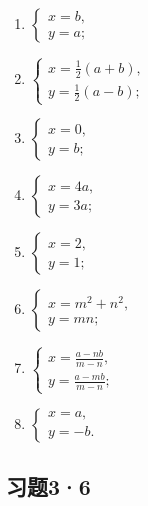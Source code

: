 \begin{enumerate}[start=1]
\item
  \(\left\{ \begin{array}{l} x = b, \\ y = a; \end{array} \right.\)
\item
  \(\left\{ \begin{array}{l} x = \frac{1}{2} (a + b), \\ y = \frac{1}{2} (a - b); \end{array} \right.\)
\item
  \(\left\{ \begin{array}{l} x = 0, \\ y = b; \end{array} \right.\)
\item
  \(\left\{ \begin{array}{l} x = 4a, \\ y = 3a; \end{array} \right.\)
\item
  \(\left\{ \begin{array}{l} x = 2, \\ y = 1; \end{array} \right.\)
\item
  \(\left\{ \begin{array}{l} x = m^2 + n^2, \\ y = mn; \end{array} \right.\)
\item
  \(\left\{ \begin{array}{l} x = \frac{a - nb}{m - n}, \\ y = \frac{a - mb}{m - n}; \end{array} \right.\)
\item
  \(\left\{ \begin{array}{l} x = a, \\ y = -b. \end{array} \right.\)
\end{enumerate}

\subsection{习题3·6}

